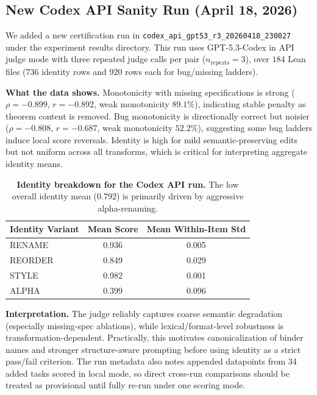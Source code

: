 \documentclass[numbers]{article}
\begin{document}
\subsection{New Codex API Sanity Run (April 18, 2026)}
We added a new certification run in
\texttt{codex\_api\_gpt53\_r3\_20260418\_230027} under the experiment results directory.
This run uses GPT-5.3-Codex in API judge mode with three repeated judge calls per pair (\(n_\text{repeats}=3\)), over \(184\) Lean files (\(736\) identity rows and \(920\) rows each for bug/missing ladders).

\textbf{What the data shows.}
Monotonicity with missing specifications is strong (\(\rho=-0.899\), \(r=-0.892\), weak monotonicity \(89.1\%\)), indicating stable penalty as theorem content is removed.
Bug monotonicity is directionally correct but noisier (\(\rho=-0.808\), \(r=-0.687\), weak monotonicity \(52.2\%\)), suggesting some bug ladders induce local score reversals.
Identity is high for mild semantic-preserving edits but not uniform across all transforms, which is critical for interpreting aggregate identity means.

\begin{table}[t]
  \centering
  \small
  \begin{tabular}{lcc}
    \toprule
    \textbf{Identity Variant} & \textbf{Mean Score} & \textbf{Mean Within-Item Std} \\
    \midrule
    RENAME                    & 0.936               & 0.005                         \\
    REORDER                   & 0.849               & 0.029                         \\
    STYLE                     & 0.982               & 0.001                         \\
    ALPHA                     & 0.399               & 0.096                         \\
    \bottomrule
  \end{tabular}
  \caption{\textbf{Identity breakdown for the Codex API run.} The low overall identity mean (\(0.792\)) is primarily driven by aggressive alpha-renaming.}
  \label{tab:codex_identity_variants}
\end{table}

\textbf{Interpretation.}
The judge reliably captures coarse semantic degradation (especially missing-spec ablations), while lexical/format-level robustness is transformation-dependent.
Practically, this motivates canonicalization of binder names and stronger structure-aware prompting before using identity as a strict pass/fail criterion.
The run metadata also notes appended datapoints from 34 added tasks scored in local mode, so direct cross-run comparisons should be treated as provisional until fully re-run under one scoring mode.
\end{document}
